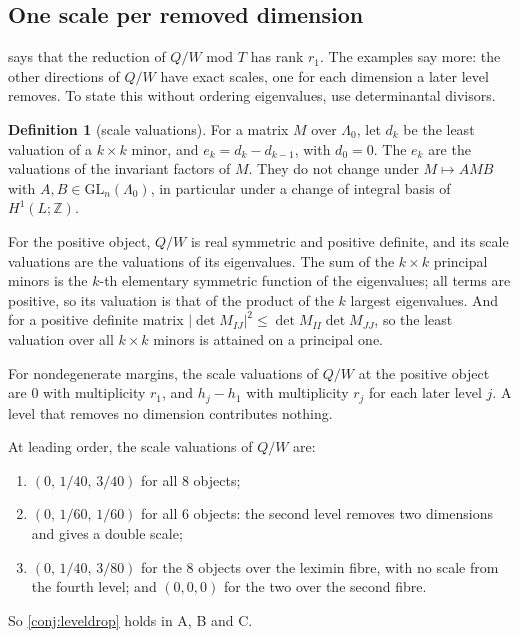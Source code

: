 \documentclass[11pt]{article}
\theoremstyle{definition}\newtheorem{definition}[theorem]{Definition}\newtheorem{remark}[theorem]{Remark}\newtheorem{example}[theorem]{Example}\newtheorem{problem}[theorem]{Open problem}\crefname{problem}{Problem}{Problems}
\begin{document}
\subsection{One scale per removed dimension}
 says that the reduction of $Q/W$ mod $T$ has rank $r_1$. The examples say more: the other directions of $Q/W$ have exact scales, one for each dimension a later level removes. To state
this without ordering eigenvalues, use determinantal divisors.

\begin{definition}[scale valuations]\label{def:scales}
For a matrix $M$ over $\Lambda_0$, let $d_k$ be the least valuation of a $k\times k$ minor, and $e_k=d_k-d_{k-1}$, with $d_0=0$. The $e_k$ are the valuations of the invariant factors of $M$. They do not
change under $M\mapsto AMB$ with $A,B\in\mathrm{GL}_n(\Lambda_0)$, in particular under a change of integral basis of $H^1(L;\mathbb Z)$.
\end{definition}

For the positive object, $Q/W$ is real symmetric and positive definite, and its scale valuations are the valuations of its eigenvalues. The sum of the $k\times k$ principal minors is the $k$-th
elementary symmetric function of the eigenvalues; all terms are positive, so its valuation is that of the product of the $k$ largest eigenvalues. And for a positive definite matrix
$|\det M_{IJ}|^2\le\det M_{II}\det M_{JJ}$, so the least valuation over all $k\times k$ minors is attained on a principal one.

\begin{conjecture}\label{conj:leveldrop}
For nondegenerate margins, the scale valuations of $Q/W$ at the positive object are $0$ with multiplicity $r_1$, and $h_j-h_1$ with multiplicity $r_j$ for each later level $j$. A level that removes no
dimension contributes nothing.
\end{conjecture}

\begin{proposition}\label{prop:scales}
At leading order, the scale valuations of $Q/W$ are:
\begin{enumerate}
\item[(A)] $(0,\,1/40,\,3/40)$ for all $8$ objects;
\item[(B)] $(0,\,1/60,\,1/60)$ for all $6$ objects: the second level removes two dimensions and gives a double scale;
\item[(C)] $(0,\,1/40,\,3/80)$ for the $8$ objects over the leximin fibre, with no scale from the fourth level; and $(0,0,0)$ for the two over the second fibre.
\end{enumerate}
So \cref{conj:leveldrop} holds in A, B and C.
\end{proposition}
\end{document}
